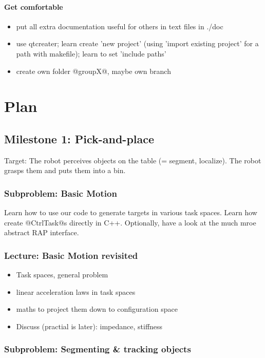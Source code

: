 \documentclass[10pt,fleqn,twoside]{article}
\begin{document}
\paragraph{Get comfortable}
\begin{itemize}
\item put all extra documentation useful for others in text files in
  ./doc
\item use qtcreater; learn create 'new project' (using 'import
  existing project' for a path with makefile); learn to set 'include paths'
\item create own folder @groupX@, maybe own branch
\end{itemize}



\section{Plan}

\subsection{Milestone 1: Pick-and-place}

Target: The robot perceives objects on the table (= segment,
localize). The robot grasps them and puts them into a bin.

\subsubsection{Subproblem: Basic Motion}

Learn how to use our code to generate targets in various task
spaces. Learn how create @CtrlTask@s directly in C++. Optionally, have
a look at the much mroe abstract RAP interface.

\subsubsection{Lecture: Basic Motion revisited}
\begin{itemize}
\item Task spaces, general problem
\item linear acceleration laws in task spaces
\item maths to project them down to configuration space
\item Discuss (practial is later): impedance, stiffness
\end{itemize}

\subsubsection{Subproblem: Segmenting \& tracking objects}
\end{document}

